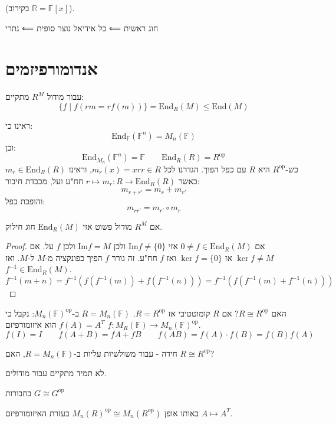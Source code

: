 \documentclass{tstextbook}
\begin{document}
(בקירוב \(\mathbb{R}=\mathbb{F}[x]\)).

חוג ראשית ⟸ כל אידיאל נוצר סופית ⟸ נתרי

\section{אנדומורפיזמים}

עבור מודול \(R^{M}\) מתקיים:
$$\{ f\mid f(r m=rf(m)) \}=\mathrm{End}_{R}(M)\leq \mathrm{End}(M)$$

\begin{example}
ראינו כי:
$$\mathrm{End}_{\mathbb{F} }(\mathbb{F} ^{n})=M_{n}(\mathbb{F} )$$
וכן:
$$\mathrm{End}_{M_{n}}(\mathbb{F} ^{n})=\mathbb{F} \qquad \mathrm{End}_{R}(R)=R^{\mathrm{op}} $$
כש-\(R^{\text{op}}\) היא \(R\) עם כפל הפוך. הגדרנו לכל \(r \in R\)\(m_{r}(x)=xr\), וראינו \(m_{r} \in \mathrm{End}_{R}(R)\) כאשר \(r \mapsto m_{r}:R\to \mathrm{End}_{R}(R)\) חח"ע ועל, מכבדת חיבור:
$$m_{r+r'}=m_{r}+m_{r'}$$
והופכת כפל:
$$m_{r r'}= m_{r'}\circ m_{r}$$

\end{example}
\begin{proposition}
אם \(R^{M}\) מודול פשוט אזי \(\mathrm{End}_{R}(M)\) חוג חילוק.

\end{proposition}
\begin{proof}
אם \(0\neq f \in \mathrm{End}_{R}(M)\) אזי \(\mathrm{\mathrm{Im}}f\neq \{ 0 \}\) ולכן \(\mathrm{Im} f = M\) ולכן \(f\) על.
אם \(\ker f \neq M\) אז \(\ker f = \{ 0 \}\) ואז \(f\) חח"ע.
זה גורר \(f\) הפיך כפונקציה מ-\(M\) ל-\(M\). ואז \(f ^{-1} \in \mathrm{End}_{R}(M)\).
$$f^{-1} (m+n)=f^{-1} (f(f^{-1} (m))+f(f^{-1} (n)))=f^{-1} (f(f^{-1} (m)+f^{-1} (n)))$$

\end{proof}
האם \(R \cong R^{\text{op}}\)? אם \(R\) קומוטטיבי אז \(R=R^{\mathrm{op}}\). \(R=M_{n}(\mathbb{F})\) ב-\(M_{n}(\mathbb{F})^{\mathrm{op}}\):
נקבל כי \(f(A)=A^{T}\) הוא איזומורפיזם \(f:M_{R}(\mathbb{F})\to M_{n}(\mathbb{F})^{\mathrm{op}}\).
$$f(I)=I\qquad f(A+B)=fA+fB\qquad f(AB)=f(A)\cdot f(B)=f(B)f(A)$$

חידה - עבור משולשיות עליות ב-\(R=M_{n}(\mathbb{F})\), האם \(R\cong R^{\mathrm{op}}\)?

לא תמיד מתקיים עבור מודולים.

בחבורות \(G\cong G^{\text{op}}\)

באותו אופן \(M_{n}(R)^{\text{op}}\cong M_{n}(R^{\text{op}})\) בעזרת האיזומורפיזם \(A\mapsto A^{T}\).
\end{document}
